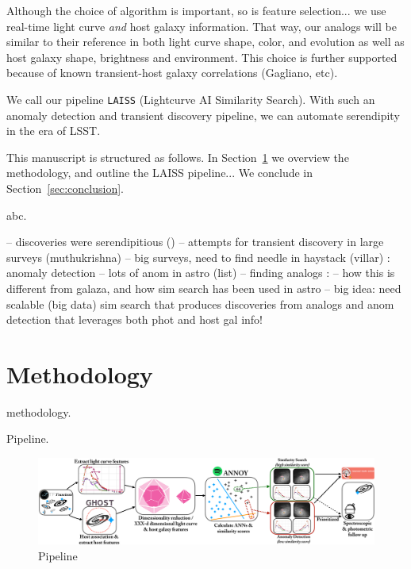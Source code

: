 \documentclass[twocolumn]{aastex63}
\newcommand{\laiss}{\texttt{LAISS}}
\begin{document}
Although the choice of algorithm is important, so is feature selection... we use real-time light curve \emph{and} host galaxy information. That way, our analogs will be similar to their reference in both light curve shape, color, and evolution as well as host galaxy shape, brightness and environment. This choice is further supported because of known transient-host galaxy correlations (Gagliano, etc).

We call our pipeline \laiss{} (Lightcurve AI Similarity Search). With such an anomaly detection and transient discovery pipeline, we can automate serendipity in the era of LSST.

This manuscript is structured as follows. In Section~\ref{sec:methodology} we overview the methodology, and outline the LAISS pipeline...  We conclude in Section~\ref{sec:conclusion}. \par



abc. \par

-- discoveries were serendipitious (\citep{Galarza2021})
-- attempts for transient discovery in large surveys (muthukrishna)
-- big surveys, need to find needle in haystack (villar) : anomaly detection
-- lots of anom in astro (list) 
-- finding analogs : \citep{Galarza2021}
-- how this is different from galaza, and how sim search has been used in astro
-- big idea: need scalable (big data) sim search that produces discoveries from analogs and anom detection that leverages both phot and host gal info!

\section{Methodology} \label{sec:methodology}

methodology. \par

Pipeline. \par

\begin{figure}
    \centering
    \includegraphics[width=18cm]{Figures/LAISS_pipeline_schematic.pdf}
    \caption{
    Pipeline
    } 
    \label{fig:pipeline}
\end{figure}
\end{document}
